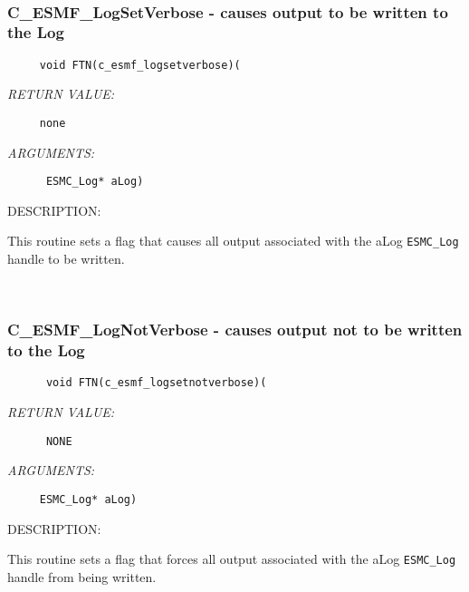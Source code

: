  
\mbox{}\hrulefill\ 
 
\subsubsection [C\_ESMF\_LogSetVerbose] {C\_ESMF\_LogSetVerbose - causes output to be written to the Log}


  
\begin{verbatim}     void FTN(c_esmf_logsetverbose)(\end{verbatim}{\em RETURN VALUE:}
\begin{verbatim}     none\end{verbatim}{\em ARGUMENTS:}
\begin{verbatim}      ESMC_Log* aLog)\end{verbatim}
{\sf DESCRIPTION:\\ }


      This routine sets a flag that causes all output associated with
      the aLog {\tt ESMC\_Log} handle to be written. 
 
\mbox{}\hrulefill\ 
 
\subsubsection [C\_ESMF\_LogNotVerbose] {C\_ESMF\_LogNotVerbose - causes output not to be written to the Log}


                         
\begin{verbatim}      void FTN(c_esmf_logsetnotverbose)(\end{verbatim}{\em RETURN VALUE:}
\begin{verbatim}      NONE\end{verbatim}{\em ARGUMENTS:}
\begin{verbatim}     ESMC_Log* aLog) \end{verbatim}
{\sf DESCRIPTION:\\ }


      This routine sets a flag that forces all output associated with
      the aLog {\tt ESMC\_Log} handle from being written. 
 
\mbox{}\hrulefill\ 
 

